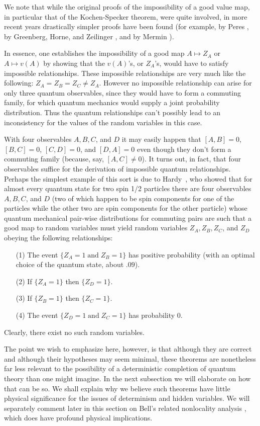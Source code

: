 \documentclass[12pt]{article}
\newcommand{\rv}{Z}
\begin{document}
We note that while the original proofs of the impossibility of a good
value map, in particular that of the Kochen-Specker theorem, were
quite involved, in more recent years drastically simpler proofs have
been found (for example, by Peres \cite{Per91}, by Greenberg, Horne,
and Zeilinger \cite{GHSZ89}, and by Mermin \cite{merm93}).


In essence, one establishes the impossibility of a good map
$A\mapsto\rv_A$ or $A\mapsto v(A)$ by showing that the $v(A)$'s, or
$\rv_A$'s, would have to satisfy impossible relationships.  These
impossible relationships are very much like the following:
$\rv_A=\rv_B=\rv_C \neq\rv_A$. However no impossible relationship can
arise for only three quantum observables, since they would have to
form a commuting family, for which quantum mechanics would supply a
joint probability distribution. Thus the quantum relationships can't
possibly lead to an inconsistency for the values of the random
variables in this case.

With four observables $A,B,C$, and $D$ it may easily happen that
$[A,B]=0$, $[B,C]=0$, $[C,D]=0$, and $[D,A]=0$ even though they don't
form a commuting family (because, say, $[A,C]\neq 0$).  It turns out,
in fact, that four observables suffice for the derivation of
impossible quantum relationships.  Perhaps the simplest example of
this sort is due to Hardy~\cite{hardy}, who showed that for almost
every quantum state for two spin 1/2 particles there are four
observables $A,B,C$, and $D$ (two of which happen to be spin
components for one of the particles while the other two are spin
components for the other particle) whose quantum mechanical pair-wise
distributions for commuting pairs are such that a good map to random
variables must yield random variables $\rv_A,\rv_B,\rv_C$, and $\rv_D$
obeying the following relationships:
\begin{itemize}
\item[(1)] The event $\{ \rv_A=1\;\mbox{and}\; \rv_B =1\}$ has
   positive probability (with an optimal choice of the quantum state,
   about $.09$).
\item[(2)] If $\{ \rv_A=1\}$ then $\{ \rv_D=1\}$.
\item[(3)] If $\{ \rv_B=1\}$ then $\{ \rv_C=1\}$.
\item[(4)] The event $\{ \rv_D=1\;\mbox{and}\; \rv_C =1\}$ has
   probability $0$.
\end{itemize}
Clearly, there exist no such random variables.

The point we wish to emphasize here, however, is that although they
are correct and although their hypotheses may seem minimal, these
theorems are nonetheless far less relevant to the possibility of a
deterministic completion of quantum theory than one might imagine. In
the next subsection we will elaborate on how that can be so. We shall
explain why we believe such theorems have little physical significance
for the issues of determinism and hidden variables.  We will
separately comment later in this section on Bell's related nonlocality
analysis \cite{Bel64}, which does have profound physical implications.
\end{document}
